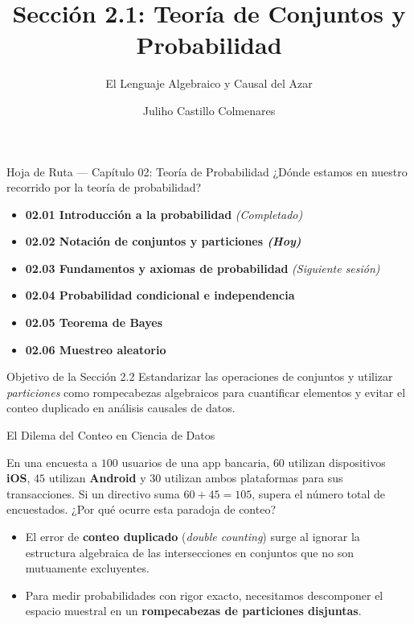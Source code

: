 \documentclass[10pt,aspectratio=169]{beamer}
\title[Notación de Conjuntos]{Sección 2.1: Teoría de Conjuntos y Probabilidad}
\subtitle{El Lenguaje Algebraico y Causal del Azar}
\author[J. Castillo Colmenares]{Juliho Castillo Colmenares}
\institute{Tecnológico de Monterrey}
\date{}
\begin{document}
\begin{frame}[plain]
  \vspace{-0.8cm}
  \titlepage
\end{frame}

\begin{frame}{Hoja de Ruta — Capítulo 02: Teoría de Probabilidad}
  ¿Dónde estamos en nuestro recorrido por la teoría de probabilidad? \pause
  \begin{itemize}
    \item \textbf{02.01 Introducción a la probabilidad} \emph{(Completado)} \pause
    \item \color{TecRojo}\textbf{02.02 Notación de conjuntos y particiones \emph{(Hoy)}}\color{black} \pause
    \item \textbf{02.03 Fundamentos y axiomas de probabilidad} \emph{(Siguiente sesión)} \pause
    \item \textbf{02.04 Probabilidad condicional e independencia} \pause
    \item \textbf{02.05 Teorema de Bayes} \pause
    \item \textbf{02.06 Muestreo aleatorio}
  \end{itemize}
  \vspace{0.6em}
  \begin{block}{Objetivo de la Sección 2.2}
    Estandarizar las operaciones de conjuntos y utilizar \emph{particiones} como rompecabezas algebraicos para cuantificar elementos y evitar el conteo duplicado en análisis causales de datos.
  \end{block}
\end{frame}

\begin{frame}{El Dilema del Conteo en Ciencia de Datos}
  \begin{motivacion}
    En una encuesta a $100$ usuarios de una app bancaria, $60$ utilizan dispositivos \textbf{iOS}, $45$ utilizan \textbf{Android} y $30$ utilizan ambos plataformas para sus transacciones. Si un directivo suma $60 + 45 = 105$, supera el número total de encuestados. ¿Por qué ocurre esta paradoja de conteo?
  \end{motivacion}
  
  \vspace{0.4em}
  \pause
  \begin{itemize}
    \item El error de \textbf{conteo duplicado} (\emph{double counting}) surge al ignorar la estructura algebraica de las intersecciones en conjuntos que no son mutuamente excluyentes. \pause
    \item Para medir probabilidades con rigor exacto, necesitamos descomponer el espacio muestral en un \textbf{rompecabezas de particiones disjuntas}.
  \end{itemize}
\end{frame}
\end{document}
